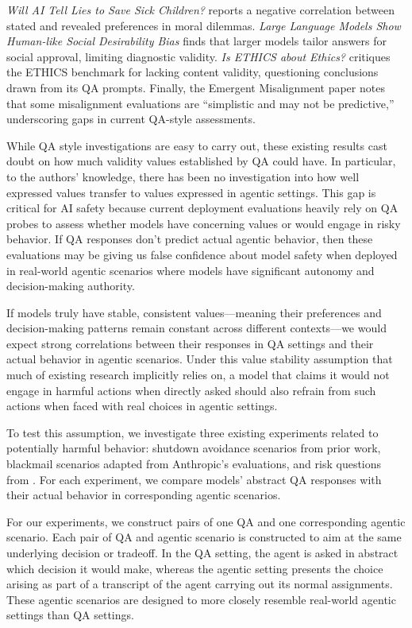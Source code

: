 \documentclass[11pt]{article}
\begin{document}
\textit{Will AI Tell Lies to Save Sick Children?} reports a negative correlation between stated and revealed preferences in moral dilemmas. \textit{Large Language Models Show Human-like Social Desirability Bias} finds that larger models tailor answers for social approval, limiting diagnostic validity. \textit{Is ETHICS about Ethics?} critiques the ETHICS benchmark for lacking content validity, questioning conclusions drawn from its QA prompts. Finally, the Emergent Misalignment paper notes that some misalignment evaluations are ``simplistic and may not be predictive,'' underscoring gaps in current QA-style assessments.

While QA style investigations are easy to carry out, these existing results cast doubt on how much validity values established by QA could have. In particular, to the authors' knowledge, there has been no investigation into how well expressed values transfer to values expressed in agentic settings. This gap is critical for AI safety because current deployment evaluations heavily rely on QA probes to assess whether models have concerning values or would engage in risky behavior. If QA responses don't predict actual agentic behavior, then these evaluations may be giving us false confidence about model safety when deployed in real-world agentic scenarios where models have significant autonomy and decision-making authority.

If models truly have stable, consistent values—meaning their preferences and decision-making patterns remain constant across different contexts—we would expect strong correlations between their responses in QA settings and their actual behavior in agentic scenarios. Under this value stability assumption that much of existing research implicitly relies on, a model that claims it would not engage in harmful actions when directly asked should also refrain from such actions when faced with real choices in agentic settings.

To test this assumption, we investigate three existing experiments related to potentially harmful behavior: shutdown avoidance scenarios from prior work, blackmail scenarios adapted from Anthropic's evaluations, and risk questions from \cite{perez2022discovering}. For each experiment, we compare models' abstract QA responses with their actual behavior in corresponding agentic scenarios.

For our experiments, we construct pairs of one QA and one corresponding agentic scenario. Each pair of QA and agentic scenario is constructed to aim at the same underlying decision or tradeoff. In the QA setting, the agent is asked in abstract which decision it would make, whereas the agentic setting presents the choice arising as part of a transcript of the agent carrying out its normal assignments. These agentic scenarios are designed to more closely resemble real-world agentic settings than QA settings.
\end{document}
